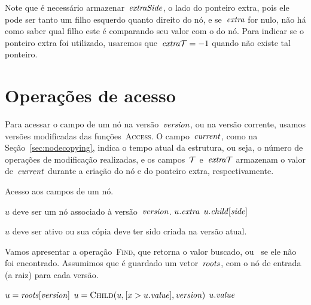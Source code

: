 \documentclass[main.tex]{subfiles}
\begin{document}
Note que é necessário armazenar~$\mathit{extraSide}$, o lado do ponteiro extra, pois ele pode ser tanto um filho esquerdo quanto direito do nó, e se~$\mathit{extra}$ for nulo, não há como saber qual filho este é comparando seu valor com o do nó. Para indicar se o ponteiro extra foi utilizado, usaremos que~$\mathit{extra\mathcal{T}} = -1$ quando não existe tal ponteiro.

\section{Operações de acesso} \label{sec:rbacesso}

Para acessar o campo de um nó na versão~$\mathit{version}$, ou na versão corrente, usamos versões modificadas das funções~\textsc{Access}. O campo~$\mathit{current}$, como na Seção~\ref{sec:nodecopying}, indica o tempo atual da estrutura, ou seja, o número de operações de modificação realizadas, e os campos~$\mathcal{T}$ e~$\mathit{extra\mathcal{T}}$ armazenam o valor de~$\mathit{current}$ durante a criação do nó e do ponteiro extra, respectivamente.

\begin{algorithm}
\caption{Acesso aos campos de um nó.}
\begin{algorithmic}[1]

\Require $u$ deve ser um nó associado à versão~$\mathit{version}$.
		\State \Return $u.\mathit{extra}$
	\EndIf
	\State \Return $u.\mathit{child}[\mathit{side}]$
\EndFunction

\Require $u$ deve ser ativo ou sua cópia deve ter sido criada na versão atual.
\State \Return {} 
\EndFunction

\end{algorithmic}
\end{algorithm}

Vamos apresentar a operação~\textsc{Find}, que retorna o valor buscado, ou~ se ele não foi encontrado. Assumimos que é guardado um vetor~$\mathit{roots}$, com o nó de entrada (a raiz) para cada versão.

\begin{algorithm}
\begin{algorithmic}[1]

	\State $u = \mathit{roots}[\mathit{version}]$
	\State $u = \Call{Child}{u, [x > u.\val], \version}$ \label{line:findrb:iver}
	\EndWhile
		\State \Return \Null
	\Else
		\State \Return $u.\mathit{value}$
	\EndIf
\EndFunction

\end{algorithmic}
\end{algorithm}
\end{document}
